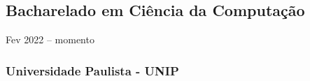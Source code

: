 \documentclass{cv}
\begin{document}
\subsection{Bacharelado em Ciência da Computação}
{Fev 2022 -- momento}
\subsubsection{Universidade Paulista - UNIP}



\end{document}

